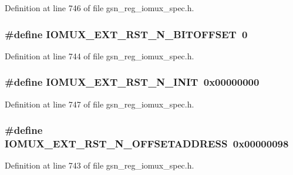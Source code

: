 Definition at line 746 of file gsn\_\-reg\_\-iomux\_\-spec.h.

\hypertarget{a00560_a044803ccadc528c2871dbeb47e093326}{
\subsubsection[{IOMUX\_\-EXT\_\-RST\_\-N\_\-BITOFFSET}]{\setlength{\rightskip}{0pt plus 5cm}\#define IOMUX\_\-EXT\_\-RST\_\-N\_\-BITOFFSET~0}}
\label{a00560_a044803ccadc528c2871dbeb47e093326}


Definition at line 744 of file gsn\_\-reg\_\-iomux\_\-spec.h.

\hypertarget{a00560_a0465a1b4f34de502504dd0f36cfc54d5}{
\subsubsection[{IOMUX\_\-EXT\_\-RST\_\-N\_\-INIT}]{\setlength{\rightskip}{0pt plus 5cm}\#define IOMUX\_\-EXT\_\-RST\_\-N\_\-INIT~0x00000000}}
\label{a00560_a0465a1b4f34de502504dd0f36cfc54d5}


Definition at line 747 of file gsn\_\-reg\_\-iomux\_\-spec.h.

\hypertarget{a00560_ad018787a6a3c2bcdc14c01ed96faf722}{
\subsubsection[{IOMUX\_\-EXT\_\-RST\_\-N\_\-OFFSETADDRESS}]{\setlength{\rightskip}{0pt plus 5cm}\#define IOMUX\_\-EXT\_\-RST\_\-N\_\-OFFSETADDRESS~0x00000098}}
\label{a00560_ad018787a6a3c2bcdc14c01ed96faf722}


Definition at line 743 of file gsn\_\-reg\_\-iomux\_\-spec.h.

